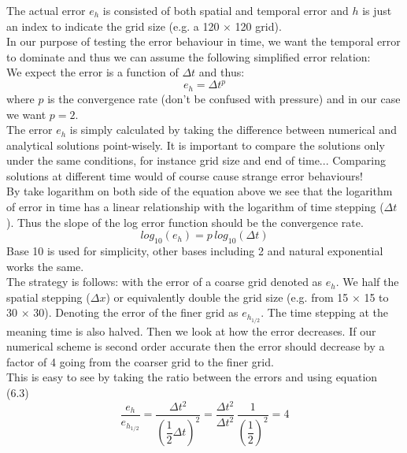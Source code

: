 The actual error $e_h$ is consisted of both spatial and temporal error and $h$ is just an index to indicate the grid size (e.g. a 120 $\times$ 120 grid).\\
In our purpose of testing the error behaviour in time, we want the temporal error to dominate and thus we can assume the following simplified error relation:\\
We expect the error is a function of $\Delta t$ and thus:
\begin{equation}
e_h = \Delta t^p
\end{equation}
where $p$ is the convergence rate (don't be confused with pressure) and in our case we want $p=2$.\\

The error $e_h$ is simply calculated by taking the difference between numerical and analytical solutions point-wisely. It is important to compare the solutions only under the same conditions, for instance grid size and end of time... Comparing solutions at different time would of course cause strange error behaviours!\\

By take logarithm on both side of the equation above we see that the logarithm of error in time has a linear relationship with the logarithm of time stepping ($\Delta t$). Thus the slope of the log error function should be the convergence rate.
\begin{equation}
log_{10} (e_h) = p\,log_{10} (\Delta t)
\end{equation}
Base 10 is used for simplicity, other bases including 2 and natural exponential works the same.\\

The strategy is follows: with the error of a coarse grid denoted as $e_h$. We half the spatial stepping ($\Delta x$) or equivalently double the grid size (e.g. from 15 $\times$ 15 to 30 $\times$ 30). Denoting the error of the finer grid as $e_{h_{1/2}}$. The time stepping at the meaning time is also halved. Then we look at how the error decreases. If our numerical scheme is second order accurate then the error should decrease by a factor of 4 going from the coarser grid to the finer grid.\\
This is easy to see by taking the ratio between the errors and using equation (6.3)
\begin{equation*}
\dfrac{e_h}{e_{h_{1/2}}} = \dfrac{\Delta t^2}{(\dfrac{1}{2}\Delta t)^2} = \dfrac{\Delta t^2}{\Delta t^2}\,\dfrac{1}{(\dfrac{1}{2})^2} = 4
\end{equation*}

